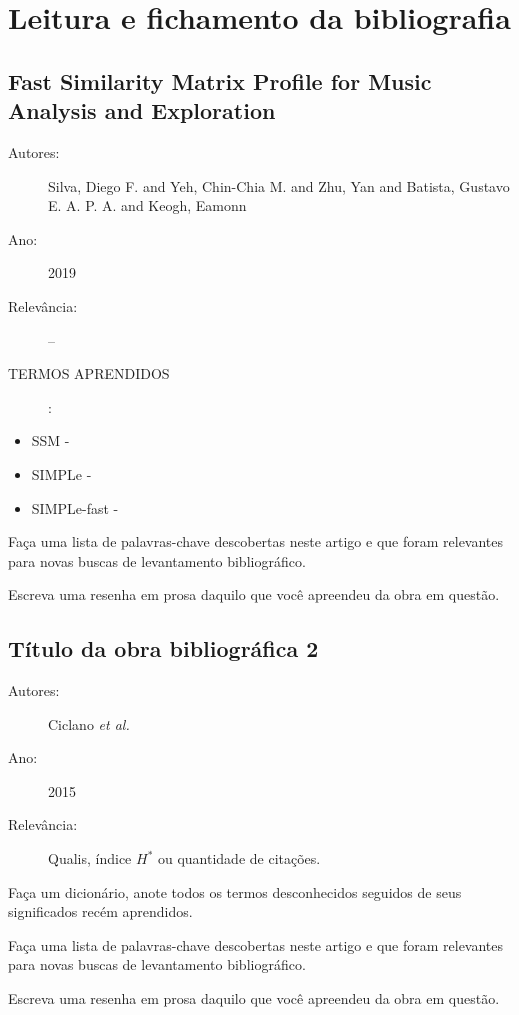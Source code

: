 \chapter{Leitura e fichamento da bibliografia}

\section{Fast Similarity Matrix Profile for Music Analysis and Exploration}

\begin{description}
\item[Autores:] Silva, Diego F. and Yeh, Chin-Chia M. and Zhu, Yan and Batista, Gustavo E. A. P. A. and Keogh, Eamonn
\item[Ano:] 2019
\item[Relevância:]--
\item[TERMOS APRENDIDOS]:
\end{description}

\begin{itemize}
    \item SSM - 
    \item SIMPLe -
    \item SIMPLe-fast -
\end{itemize}

Faça uma lista de palavras-chave descobertas neste artigo e que foram relevantes para novas buscas de levantamento bibliográfico.

Escreva uma resenha em prosa daquilo que você apreendeu da obra em questão.

\section{Título da obra bibliográfica 2}

\begin{description}
\item[Autores:] Ciclano \emph{et al.}
\item[Ano:] 2015
\item[Relevância:] Qualis, índice $H^*$ ou quantidade de citações.
\end{description}

Faça um dicionário, anote todos os termos desconhecidos seguidos de seus significados recém aprendidos.

Faça uma lista de palavras-chave descobertas neste artigo e que foram relevantes para novas buscas de levantamento bibliográfico.

Escreva uma resenha em prosa daquilo que você apreendeu da obra em questão.